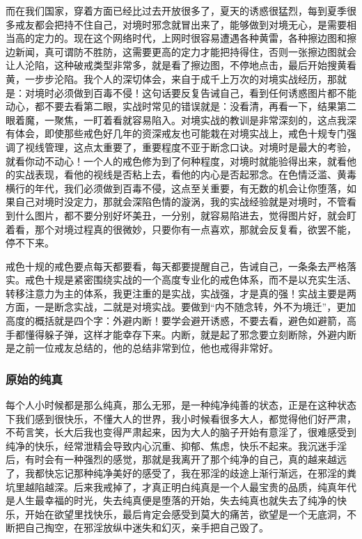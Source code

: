 而在我们国家，穿着方面已经比过去开放很多了，夏天的诱惑很猛烈，每到夏季很多戒友都会把持不住自己，对境时邪念就冒出来了，能够做到对境无心，是需要相当高的定力的。现在这个网络时代，上网时很容易遭遇各种黄雷，各种擦边图和擦边新闻，真可谓防不胜防，这需要更高的定力才能把持得住，否则一张擦边图就会让人沦陷，这种破戒类型非常多，就是看了擦边图，不停地点击，最后开始搜黄看黄，一步步沦陷。我个人的深切体会，来自于成千上万次的对境实战经历，那就是：对境时必须做到百毒不侵！这句话要反复告诫自己，看到任何诱惑图片都不能动心，都不要去看第二眼，实战时常见的错误就是：没看清，再看一下，结果第二眼着魔，一聚焦，一盯着看就容易陷入。对境实战的教训是非常深刻的，这点我深有体会，即使那些戒色好几年的资深戒友也可能栽在对境实战上，戒色十规专门强调了视线管理，这点太重要了，重要程度不亚于断念口诀。对境时是最大的考验，就看你动不动心！一个人的戒色修为到了何种程度，对境时就能验得出来，就看他的实战表现，看他的视线是否粘上去，看他的内心是否起邪念。在色情泛滥、黄毒横行的年代，我们必须做到百毒不侵，这点至关重要，有无数的机会让你堕落，如果自己对境时没定力，那就会深陷色情的漩涡，我的实战经验就是对境时，不管看到什么图片，都不要分别好坏美丑，一分别，就容易陷进去，觉得图片好，就会盯着看，那个对境过程真的很微妙，只要你有一点喜欢，那就会反复看，欲罢不能，停不下来。

戒色十规的戒色要点每天都要看，每天都要提醒自己，告诫自己，一条条去严格落实。戒色十规是紧密围绕实战的一个高度专业化的戒色体系，而不是以充实生活、转移注意力为主的体系，我更注重的是实战，实战强，才是真的强！实战主要是两方面，一是断念实战，二就是对境实战。要做到“内不随念转，外不为境迁”，更加高度的概括就是四个字：外避内断！要学会避开诱惑，不要去看，避色如避箭，高手都懂得躲子弹，这样才能幸存下来。内断，就是起了邪念要立刻断除，外避内断是之前一位戒友总结的，他的总结非常到位，他也戒得非常好。

\subsubsection{原始的纯真}

每个人小时候都是那么纯真，那么无邪，是一种纯净纯善的状态，正是在这种状态下我们感到很快乐，不懂大人的世界，我小时候看很多大人，都觉得他们好严肃，不苟言笑，长大后我也变得严肃起来，因为大人的脑子开始有意淫了，很难感受到纯净的快乐，经常泄精会导致内心沉重、抑郁、焦虑，快乐不起来。我沉迷手淫后，有时会有一种强烈的感觉，那就是我离开了那个纯净的自己，真的越来越远了，我都快忘记那种纯净美好的感受了，我在邪淫的歧途上渐行渐远，在邪淫的粪坑里越陷越深。后来我戒掉了，才真正明白纯真是一个人最宝贵的品质，纯真年代是人生最幸福的时光，失去纯真便是堕落的开始，失去纯真也就失去了纯净的快乐，开始在欲望里找快乐，最后肯定会感受到莫大的痛苦，欲望是一个无底洞，不断把自己掏空，在邪淫放纵中迷失和幻灭，亲手把自己毁了。

